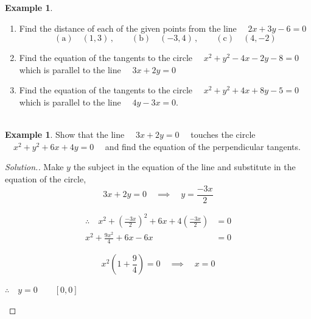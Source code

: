 \documentclass[11pt,a4paper]{article}
\theoremstyle{definition}
\newtheorem{example}[thm]{Example}
\newenvironment{solution}
  {\renewcommand{\qedsymbol}{}\begin{proof}[\textit{Solution}.]}
  {\end{proof}}
\begin{document}
\begin{example}

\begin{enumerate}
\item Find the distance of each of the given points from the line $\quad  2x + 3y - 6 = 0$
$$(\text{a}) \quad  (1,3)\,, \qquad   (\text{b}) \quad  (-3,4)\,, \qquad  (\text{c}) \quad  (4,-2)$$

\item Find the equation of the tangents to the circle $\quad  x^2 + y^2 - 4x - 2y - 8 = 0\quad $ which is parallel to the  line $\quad  3x + 2y = 0$

\item Find the equation of the tangents to the circle $\quad  x^2 + y^2 + 4x + 8y - 5 = 0\quad $ which is parallel to the line $\quad  4y - 3x = 0$.\\\\
\end{enumerate}
\end{example}
\begin{example}

Show that the line $\quad  3x + 2y = 0\quad $ touches the circle $\quad  x^2 + y^2 + 6x + 4y = 0\quad $ and find the equation of the perpendicular tangents.
\end{example}
\begin{solution}

Make $y$ the subject in the equation of the line and substitute in the equation of the circle, $$3x + 2y = 0 \quad \implies \quad  y  = \frac{-3x}{2}$$


\begin{align*}
\therefore\quad  x^2 + \left(\frac{-3x}{2}\right)^2 + 6x + 4 \left(\frac{-3x}{2}\right)&  = 0 \\
x^2 + \frac{9x^2}{4} + 6x - 6x & = 0
\end{align*}


$$x^2\left( 1 + \frac{9}{4}\right) = 0 \quad  \implies \quad  x = 0$$

$\therefore\quad  y = 0\qquad  [0,0]$

\begin{figure}[H]
\centering
{}
\end{figure}
\end{solution}
\end{document}
